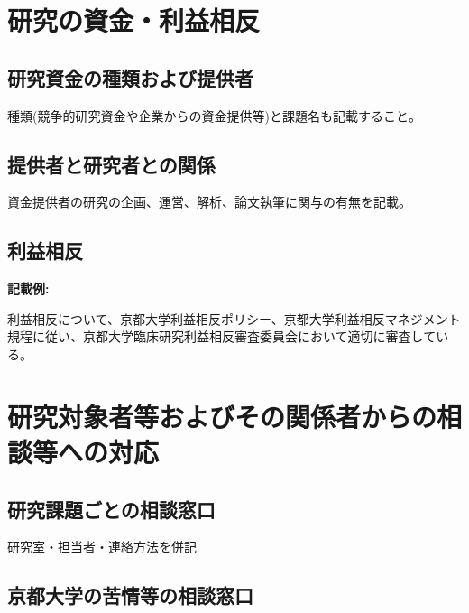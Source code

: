 \documentclass{kyodai-protocol}
\begin{document}
\section{研究の資金・利益相反}
\label{sec:funding-coi}

\subsection{研究資金の種類および提供者}

種類(競争的研究資金や企業からの資金提供等)と課題名も記載すること。

\subsection{提供者と研究者との関係}

資金提供者の研究の企画、運営、解析、論文執筆に関与の有無を記載。

\subsection{利益相反}

\textbf{記載例:}

利益相反について、京都大学利益相反ポリシー、京都大学利益相反マネジメント規程に従い、京都大学臨床研究利益相反審査委員会において適切に審査している。

\section{研究対象者等およびその関係者からの相談等への対応}
\label{sec:consultation}

\subsection{研究課題ごとの相談窓口}

研究室・担当者・連絡方法を併記

\subsection{京都大学の苦情等の相談窓口}
\end{document}
